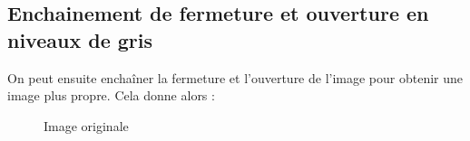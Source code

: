 \documentclass[french,a4paper,10pt]{article}
\begin{document}
	\subsection{Enchainement de fermeture et ouverture en niveaux de gris}\label{subsec:5.5}

	On peut ensuite enchaîner la fermeture et l'ouverture de l'image pour obtenir une image plus propre.
	Cela donne alors :
	\begin{figure}[!htb]
		\begin{minipage}{0.30\textwidth}
			\centering
			\caption{Image originale}\label{Fig:orig-08-6}
		\end{minipage}\hfill
		\begin{minipage}{0.30\textwidth}
			\centering

\end{minipage}
\end{figure}
\end{document}
